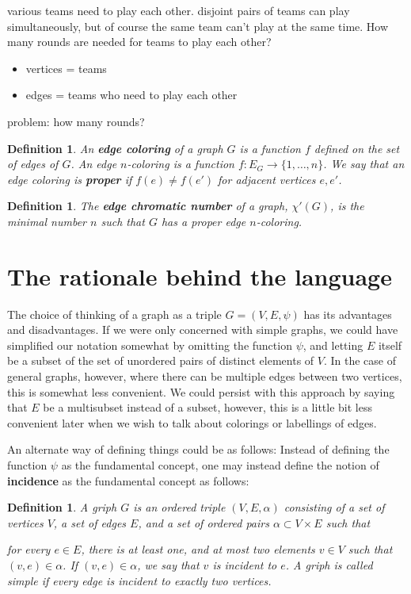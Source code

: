 \documentclass[12pt]{report}
\theoremstyle{plain}
\newtheorem{defn}[thm]{Definition}
\newcommand{\Xb}[1]{\textbf{#1}\index{#1}}
\begin{document}
various teams need to play each other. disjoint pairs of teams can play
simultaneously, but of course the same team can't play at the same time.
How many rounds are needed for teams to play each other?
\begin{itemize}
\item vertices = teams
\item edges = teams who need to play each other
\end{itemize}
problem: how many rounds?

\begin{defn}
An \Xb{edge coloring} of a graph $G$ is a function $f$ defined on the set of
edges of $G$. An edge $n$-coloring is a function $f : E_G \to \{1,
\ldots, n\}$. We say that an edge coloring is \textbf{proper} if $f(e) \neq f(e')$ for adjacent vertices $e, e'$.
\end{defn}

\begin{defn}
The \Xb{edge chromatic number} of a graph, $\chi'(G)$, is the minimal
number $n$ such that $G$ has a proper edge $n$-coloring.
\end{defn}


\section{The rationale behind the language}

The choice of thinking of a graph as a triple $G = (V, E, \psi)$ has its
advantages and disadvantages. If we were only concerned with simple graphs,
we could have simplified our notation somewhat by omitting the function
$\psi$, and letting $E$ itself be a subset of the set of 
unordered pairs of distinct elements of $V$. In the case of general graphs,
however, where there can be multiple edges between two vertices, this is
somewhat less convenient. We could persist with this approach by saying
that $E$ be a multisubset instead of a subset, however, this is a little
bit less convenient later when we wish to talk about colorings or
labellings of edges.

An alternate way of defining things could be as follows: Instead of
defining the function $\psi$ as the fundamental concept, one may instead
define the notion of \textbf{incidence} as the fundamental concept as
follows:

\begin{defn} \label{griph}
A griph $G$ is an ordered triple $(V, E, \alpha)$ consisting of a set of
vertices $V$, a set of edges $E$, and a set of ordered pairs $\alpha
\subset V \times E$ such that \item for every $e \in E$, there is at least
one, and at most two elements $v \in V$ such that $(v, e) \in \alpha$. If
$(v, e) \in \alpha$, we say that $v$ is incident to $e$. A griph is called
simple if every edge is incident to exactly two vertices.
\end{defn}
\end{document}

